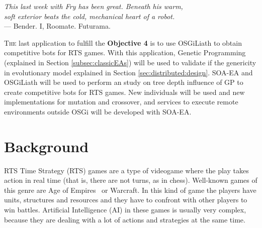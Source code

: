 \label{chap:rts}
\begin{flushright}{\slshape
    This last week with Fry has been great. Beneath his warm,  
    \\soft exterior beats the cold, mechanical heart of a robot. } \\ \medskip
    --- {Bender. I, Roomate. Futurama.}
\end{flushright}
\minitoc\mtcskip
\vfill

\lettrine{T}{he} last application to fulfill the \textbf{Objective 4} is to use OSGiLiath to obtain competitive bots for RTS games. With this application, Genetic Programming (explained in Section \ref{subsec:classicEAs}) will be used to validate if the genericity in evolutionary model explained in Section \ref{sec:distributed:design}. SOA-EA and OSGiLiath will be used to perform an study on tree depth influence of GP to create competitive bots for RTS games. New individuals will be used and new implementations for mutation and crossover, and services to execute remote environments outside OSGi will be developed with SOA-EA.


\section{Background}

RTS Time Strategy (RTS) games are a type of videogame
where the play takes action in real time (that is, there are not
turns, as in chess). Well-known games of this genre are Age of
Empires\texttrademark~ or Warcraft\texttrademark. In this kind of game
the players have units, structures and resources and they have to
confront with other players to win battles. Artificial Intelligence
(AI) in these games is usually very complex, because they are dealing
with a lot of actions and strategies at the same time. %

